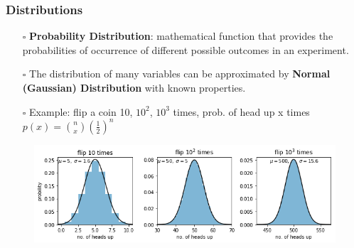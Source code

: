 \documentclass[handout]{beamer}
\begin{document}
\begin{frame}
    \frametitle{Distributions}
    \begin{itemize}[wide = 0pt]
        \item[$\square$] \textbf{Probability Distribution}: mathematical function that provides the probabilities of occurrence of different possible outcomes in an experiment.
        \item[$\square$] The distribution of many variables can be approximated by \textbf{\color{red}Normal (Gaussian) Distribution} with known properties.
        \item[$\square$] Example: flip a coin 10, $10^2$, $10^3$ times, prob. of head up x times $p(x)=\binom nx (\frac{1}{2})^n$
    \end{itemize}
    \centering
    \begin{figure}
		\includegraphics[width=.8\textwidth]{binomial.png} 
	\end{figure}
\end{frame}
\end{document}
